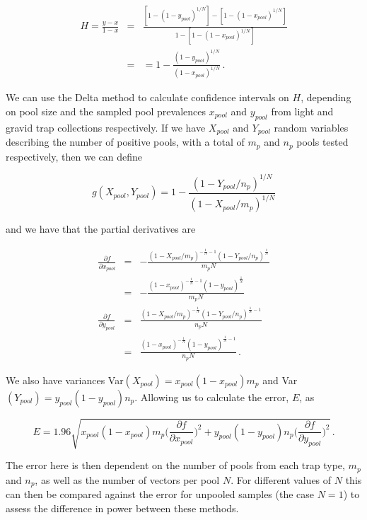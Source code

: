 \begin{eqnarray}
    H = \frac{y-x}{1-x} &=& \frac{[1-(1-y_{pool})^{1/N}] - [1-(1-x_{pool})^{1/N}]}{1-[1-(1-x_{pool})^{1/N}]}\\
    &=&= 1 - \frac{(1-y_{pool})^{1/N}}{(1-x_{pool})^{1/N}} \,.
\end{eqnarray}

We can use the Delta method to calculate confidence intervals on $H$, depending on pool size and the sampled pool prevalences $x_{pool}$ and $y_{pool}$ from light and gravid trap collections respectively. If we have $X_{pool}$ and $Y_{pool}$ random variables describing the number of positive pools, with a total of $m_p$ and $n_p$ pools tested respectively, then we can define

\begin{equation}
    g(X_{pool},Y_{pool}) = 1 - \frac{(1 - Y_{pool}/n_p)^{1/N}}{(1 - X_{pool}/m_p)^{1/N}}
\end{equation}

and we have that the partial derivatives are

\begin{eqnarray}
    \frac{\partial f}{\partial x_{pool}} &=& -\frac{(1-X_{pool}/m_p)^{-\frac{1}{N} - 1}(1-Y_{pool}/n_p)^{\frac{1}{N}}}{m_p N}\\
    &=& -\frac{(1-x_{pool})^{-\frac{1}{N} - 1}(1-y_{pool})^{\frac{1}{N}}}{m_p N} \\
    \frac{\partial f}{\partial y_{pool}} &=& \frac{(1-X_{pool}/m_p)^{-\frac{1}{N}}(1-Y_{pool}/n_p)^{\frac{1}{N}-1}}{n_p N}\\
    &=& \frac{(1-x_{pool})^{-\frac{1}{N}}(1-y_{pool})^{\frac{1}{N}-1}}{n_p N} \,.
\end{eqnarray}

We also have variances Var$(X_{pool}) = x_{pool}(1-x_{pool})m_p$ and Var$(Y_{pool}) = y_{pool}(1-y_{pool})n_p$. Allowing us to calculate the error, $E$, as

\begin{equation}
    E = 1.96\sqrt{x_{pool}(1-x_{pool})m_p\Bigg(\frac{\partial f}{\partial x_{pool}}\Bigg)^2 +  y_{pool}(1-y_{pool})n_p\Bigg(\frac{\partial f}{\partial y_{pool}} \Bigg)^2} \,.
\end{equation}

The error here is then dependent on the number of pools from each trap type, $m_p$ and $n_p$, as well as the number of vectors per pool $N$. For different values of $N$ this can then be compared against the error for unpooled samples (the case $N=1$) to assess the difference in power between these methods.


